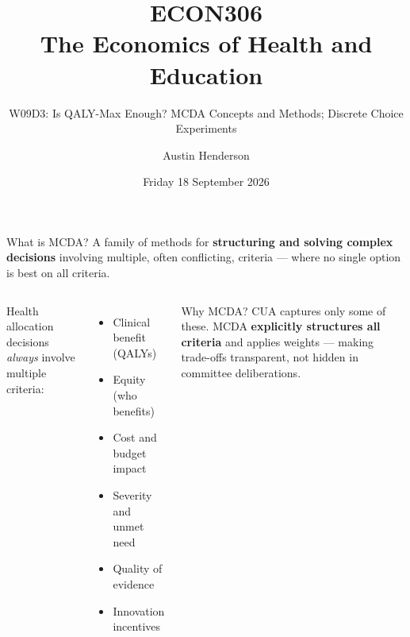 \documentclass[aspectratio=169, 12pt]{beamer}
\title[ECON306: W09D3 — MCDA and DCEs]{ECON306\\The Economics of Health and Education}
\subtitle{W09D3: Is QALY-Max Enough? MCDA Concepts and Methods; Discrete Choice Experiments}
\author{Austin Henderson}
\institute{Department of Economics\\University of Otago}
\date{Friday 18 September 2026}
\begin{document}
\begin{frame}[plain]
  \titlepage
\end{frame}



\begin{frame}{What is MCDA?}
  \small
  A family of methods for \textbf{structuring and solving complex decisions} involving multiple,
  often conflicting, criteria --- where no single option is best on all criteria.
  \vspace{0.2em}
  \begin{columns}
      \small Health allocation decisions \emph{always} involve multiple criteria:
      \begin{itemize}
        \item Clinical benefit (QALYs)
        \item Equity (who benefits)
        \item Cost and budget impact
        \item Severity and unmet need
        \item Quality of evidence
        \item Innovation incentives
      \end{itemize}
      \begin{block}{Why MCDA?}
        \small CUA captures only some of these. MCDA \textbf{explicitly structures all criteria} and applies weights --- making trade-offs transparent, not hidden in committee deliberations.
      \end{block}
  \end{columns}
\end{frame}
\end{document}
